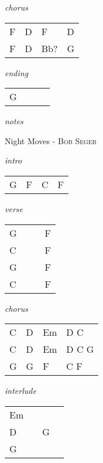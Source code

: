 \documentclass[12pt]{article}
\begin{document}
\textit{chorus}

\begin{tabular}{|P{1.25in}|P{1.25in}|P{1.25in}|P{1.25in}|}
  F & D  & F  &  D \\
  F & D & Bb? & G  \\
\end{tabular}

\textit{ending}

\begin{tabular}{|P{1.25in}|P{1.25in}|P{1.25in}|P{1.25in}|}
  G &   &   &   \\
\end{tabular}

\textit{notes}

\newpage

{\Huge Night Moves} {\huge - \textsc{Bob Seger}}

\huge
\textit{intro}

\begin{tabular}{|P{1.25in}|P{1.25in}|P{1.25in}|P{1.25in}|}
  G & F & C & F \\
\end{tabular}

\textit{verse}

\begin{tabular}{|P{1.25in}|P{1.25in}|P{1.25in}|P{1.25in}|}
  G &   &   &  F \\
  C &   &   &  F \\
  G &   &   &  F \\
  C &   &   &  F \\
\end{tabular}

\textit{chorus}

\begin{tabular}{|P{1.25in}|P{1.25in}|P{1.25in}|P{1.25in}|}
  C & D  & Em  &  D C \\
  C & D  & Em  &  D C G \\
  G & G & F & C F \\
\end{tabular}

\textit{interlude}

\begin{tabular}{|P{1.25in}|P{1.25in}|P{1.25in}|P{1.25in}|}
  Em &   &   &   \\
  D &   & G  &   \\
  G &   &   &   \\
\end{tabular}
\end{document}
